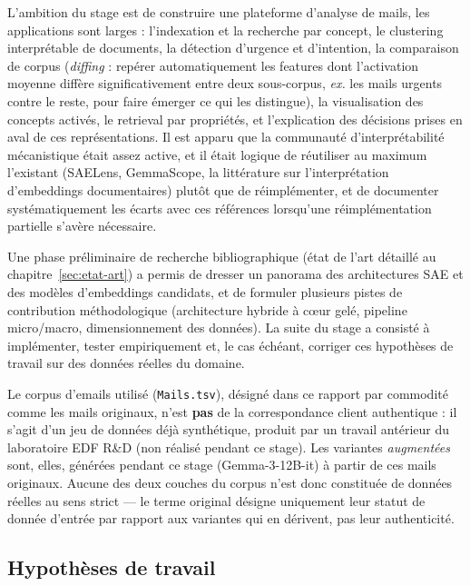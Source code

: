 \documentclass[11pt]{article}
\begin{document}
L'ambition du stage est de construire une plateforme d'analyse de
mails, les applications sont larges : l'indexation et la recherche par concept, le clustering
interprétable de documents, la détection d'urgence et d'intention, la
comparaison de corpus (\emph{diffing} : repérer automatiquement les features
dont l'activation moyenne diffère significativement entre deux sous-corpus,
\emph{ex.} les mails \og{}urgents\fg{} contre le reste, pour faire émerger ce
qui les distingue), la visualisation des concepts activés, le retrieval par
propriétés, et l'explication des décisions prises en aval de ces
représentations. Il est apparu que la communauté d'interprétabilité mécanistique était assez active, et il était logique de réutiliser au maximum
l'existant (SAELens, GemmaScope, la littérature sur l'interprétation
d'embeddings documentaires) plutôt que de réimplémenter, et de documenter
systématiquement les écarts avec ces références lorsqu'une réimplémentation
partielle s'avère nécessaire.

Une phase préliminaire de recherche bibliographique (état de l'art détaillé au
chapitre~\ref{sec:etat-art}) a permis de dresser un panorama des architectures
SAE et des modèles d'embeddings candidats, et de formuler plusieurs pistes de
contribution méthodologique (architecture hybride à cœur gelé, pipeline
micro/macro, dimensionnement des données). La suite du stage a consisté à
implémenter, tester empiriquement et, le cas échéant, corriger ces
hypothèses de travail sur des données réelles du domaine.

\begin{definitionbox}
Le corpus d'emails utilisé (\texttt{Mails.tsv}), désigné dans ce rapport par
commodité comme les mails \og{}originaux\fg{}, n'est \textbf{pas} de la
correspondance client authentique : il s'agit d'un jeu de données déjà
synthétique, produit par un travail antérieur du laboratoire EDF R\&D (non
réalisé pendant ce stage). Les variantes \emph{augmentées} sont, elles,
générées pendant ce stage (Gemma-3-12B-it) à partir de ces mails
\og{}originaux\fg{}. Aucune des deux couches du corpus n'est donc constituée
de données réelles au sens strict --- le terme \og{}original\fg{} désigne
uniquement leur statut de donnée d'entrée par rapport aux variantes qui en
dérivent, pas leur authenticité.
\end{definitionbox}

\subsection{Hypothèses de travail}
\end{document}

